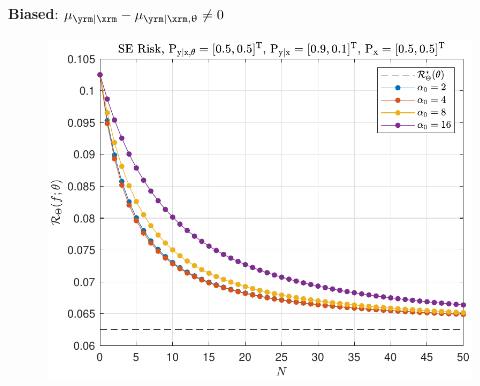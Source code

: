 \documentclass[aspectratio=169,usenames,dvipsnames]{beamer}
\begin{document}
\begin{frame}
\begin{columns}[c]
\begin{column}{0.5\linewidth}
\centering
\textbf{Biased}: $\mu_{\yrm | \xrm} - \mu_{\yrm | \xrm,\uptheta} \neq 0$
%
\begin{figure}
\centering
\includegraphics[width=1\linewidth]{Risk_cond_SE_Dir_N_leg_a0_biased.pdf}
\end{figure}

\end{column}

\end{columns}

\centering
{}

\end{frame}
\end{document}
